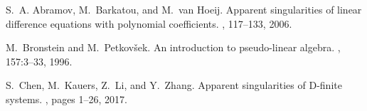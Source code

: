 \documentclass[10pt,a4paper]{article}
\begin{document}

% 
\begin{thebibliography}{10}

S.~A. Abramov, M.~Barkatou, and M.~van Hoeij.
\newblock Apparent singularities of linear difference equations with polynomial
  coefficients.
, 117--133, 2006.
% 
% 

% 
% 
% 


M.~Bronstein and M.~Petkov{\v{s}}ek.
\newblock An introduction to pseudo-linear algebra.
, 157:3--33, 1996.
  
S.~Chen, M.~Kauers, Z.~Li, and Y.~Zhang.
\newblock Apparent singularities of {D}-finite systems.
, pages 1--26, 2017.
  

% 


\end{thebibliography}
\end{document}
